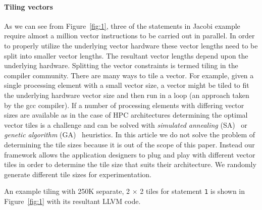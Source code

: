 \paragraph{\textbf{Tiling vectors}}
\label{sec:tiling-vector-counts}

As we can see from Figure~\ref{fig:1}, three of the statements in Jacobi
example require almost a million vector instructions to be carried out
in parallel. %
In order to properly utilize the underlying vector hardware these vector
lengths need to be split into smaller vector lengths. The resultant
vector lengths depend upon the underlying hardware. Splitting the vector
constraints is termed tiling in the compiler community. There are many
ways to tile a vector. For example, given a single processing element
with a small vector size, a vector might be tiled to fit the underlying
hardware vector size and then run in a loop (an approach taken by the
gcc compiler). If a number of processing elements with differing vector
sizes are available as in the case of HPC architectures determining the
optimal vector tiles is a challenge and can be solved with
\textit{simulated annealing} (SA)~\cite{tbra01} or \textit{genetic
  algorithm} (GA)~\cite{tbra01} heuristics. In this article we do not
solve the problem of determining the tile sizes because it is out of the scope of this paper. Instead our framework
allows the application designers to plug and play with different vector
tiles in order to determine the tile size that suits their
architecture. We randomly generate different tile sizes for
experimentation.

An example tiling with 250K separate, 2 $\times$ 2 tiles for statement
\texttt{1} is shown in Figure~\ref{fig:1} with its resultant LLVM
code. %



